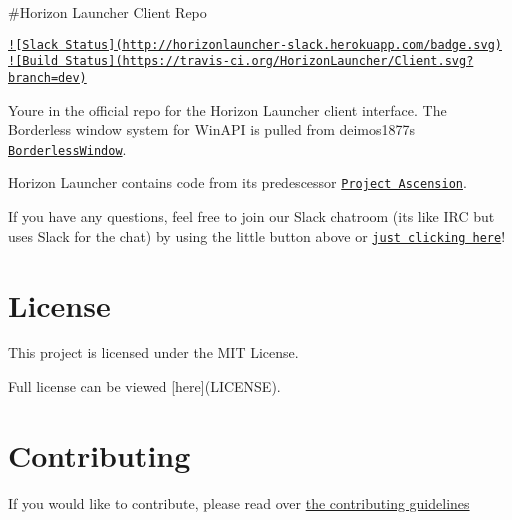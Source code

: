 \#\+Horizon Launcher Client Repo

\href{http://slack.launchhorizon.com}{\tt !\mbox{[}Slack Status\mbox{]}(http\+://horizonlauncher-\/slack.\+herokuapp.\+com/badge.\+svg)} \href{https://travis-ci.org/HorizonLauncher/Client}{\tt !\mbox{[}Build Status\mbox{]}(https\+://travis-\/ci.\+org/\+Horizon\+Launcher/\+Client.\+svg?branch=dev)}

You\textquotesingle{}re in the official repo for the Horizon Launcher client interface. The Borderless window system for Win\+A\+P\+I is pulled from deimos1877\textquotesingle{}s \href{http://github.com/deimos1877/BorderlessWindow}{\tt Borderless\+Window}.

Horizon Launcher contains code from its predescessor \href{https://github.com/Proj-Ascension}{\tt Project Ascension}.

If you have any questions, feel free to join our Slack chatroom (it\textquotesingle{}s like I\+R\+C but uses Slack for the chat) by using the little button above or \href{http://horizonlauncher-slack.herokuapp.com}{\tt just clicking here}!

\section*{License}

This project is licensed under the M\+I\+T License.

Full license can be viewed \mbox{[}here\mbox{]}(L\+I\+C\+E\+N\+S\+E).

\section*{Contributing}

If you would like to contribute, please read over \hyperlink{md__c_o_n_t_r_i_b_u_t_i_n_g}{the contributing guidelines} 